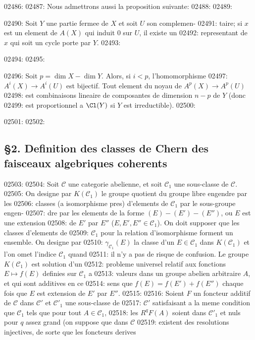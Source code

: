 02486: 
02487: Nous admettrons aussi la proposition suivante:
02488: 
02489: \begin{proposition}
02490: Soit $Y$ une partie fermee de $X$ et soit $U$ son complemen-
02491: taire; si $x$ est un element de $A(X)$ qui induit $0$ sur $U$, il existe un
02492: representant de $x$ qui soit un cycle porte par $Y$.
02493: \end{proposition}
02494: 
02495: \begin{corollary}
02496: Soit $p = \dim X - \dim Y$. Alors, si $i < p$, l'homomorphisme
02497: $A^i(X) \to A^i(U)$ est bijectif. Tout element du noyau de $A^p(X) \to A^p(U)$
02498: est combinaisons lineaire de composantes de dimension $n - p$ de $Y$ (donc
02499: est proportionnel a $\Cl(Y)$ si $Y$ est irreductible).
02500: \end{corollary}
02501: 
02502: \subsection*{\S 2. Definition des classes de Chern des faisceaux algebriques coherents}
02503: 
02504: Soit $\mathcal{C}$ une categorie abelienne, et soit $\mathcal{C}_1$ une sous-classe de $\mathcal{C}$.
02505: On designe par $K(\mathcal{C}_1)$ le groupe quotient du groupe libre engendre par les
02506: classes (a isomorphisme pres) d'elements de $\mathcal{C}_1$ par le sous-groupe engen-
02507: dre par les elements de la forme $(E) - (E') - (E'')$, ou $E$ est une extension
02508: de $E'$ par $E''$ ($E, E', E'' \in \mathcal{C}_1$). On doit supposer que les classes d'elements de
02509: $\mathcal{C}_1$ pour la relation d'isomorphisme forment un ensemble. On designe par
02510: $\gamma_{\mathcal{C}_1}(E)$ la classe d'un $E \in \mathcal{C}_1$ dans $K(\mathcal{C}_1)$ et l'on omet l'indice $\mathcal{C}_1$ quand
02511: il n'y a pas de risque de confusion. Le groupe $K(\mathcal{C}_1)$ est solution d'un
02512: probleme universel relatif aux fonctions $E \mapsto f(E)$ definies sur $\mathcal{C}_1$ a
02513: valeurs dans un groupe abelien arbitraire $A$, et qui sont additives en ce
02514: sens que $f(E) = f(E') + f(E'')$ chaque fois que $E$ est extension de $E'$ par $E''$.
02515: 
02516: Soient $F$ un foncteur additif de $\mathcal{C}$ dans $\mathcal{C}'$ et $\mathcal{C}'_1$ une sous-classe de
02517: $\mathcal{C}'$ satisfaisant a la meme condition que $\mathcal{C}_1$ tels que pour tout $A \in \mathcal{C}_1$,
02518: les $R^qF(A)$ soient dans $\mathcal{C}'_1$ et nuls pour $q$ assez grand (on suppose que dans $\mathcal{C}$
02519: existent des resolutions injectives, de sorte que les foncteurs derives
